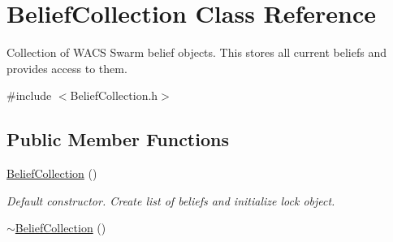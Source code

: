 \hypertarget{class_belief_collection}{
\section{BeliefCollection Class Reference}
\label{class_belief_collection}
}


Collection of WACS Swarm belief objects. This stores all current beliefs and provides access to them.  




{\ttfamily \#include $<$BeliefCollection.h$>$}

\subsection*{Public Member Functions}
\begin{DoxyCompactItemize}
\item 
\hypertarget{class_belief_collection_af5681322d742e00dd490b6490c992da7}{
\hyperlink{class_belief_collection_af5681322d742e00dd490b6490c992da7}{BeliefCollection} ()}
\label{class_belief_collection_af5681322d742e00dd490b6490c992da7}

\begin{DoxyCompactList}\small\item\em Default constructor. Create list of beliefs and initialize lock object. \end{DoxyCompactList}\item 
\hypertarget{class_belief_collection_a38339ed9c83711159fc29b943362c3d3}{
\hyperlink{class_belief_collection_a38339ed9c83711159fc29b943362c3d3}{$\sim$BeliefCollection} ()}
\label{class_belief_collection_a38339ed9c83711159fc29b943362c3d3}


\end{DoxyCompactItemize}
